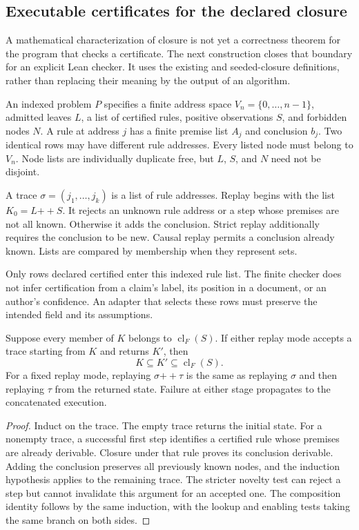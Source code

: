 \subsection{Executable certificates for the declared closure}
\label{sec:trace-checker}

A mathematical characterization of closure is not yet a correctness theorem for the program that checks a certificate. The next construction closes that boundary for an explicit Lean checker. It uses the existing  and seeded-closure definitions, rather than replacing their meaning by the output of an algorithm.

\begin{definition}
\label{res:trace:problem}
An indexed problem $P$ specifies a finite address space $V_n=\{0,\ldots,n-1\}$, admitted leaves $L$, a list of certified rules, positive observations $S$, and forbidden nodes $N$. A rule at address $j$ has a finite premise list $A_j$ and conclusion $b_j$. Two identical rows may have different rule addresses. Every listed node must belong to $V_n$. Node lists are individually duplicate free, but $L$, $S$, and $N$ need not be disjoint.

A trace $\sigma=(j_1,\ldots,j_k)$ is a list of rule addresses. Replay begins with the list $K_0=L\mathbin{+\!+}S$. It rejects an unknown rule address or a step whose premises are not all known. Otherwise it adds the conclusion. Strict replay additionally requires the conclusion to be new. Causal replay permits a conclusion already known. Lists are compared by membership when they represent sets.
\end{definition}

Only rows declared certified enter this indexed rule list. The finite checker does not infer certification from a claim's label, its position in a document, or an author's confidence. An adapter that selects these rows must preserve the intended field and its assumptions.

\begin{theorem}
\label{res:trace:replay}
Suppose every member of $K$ belongs to $\operatorname{cl}_F(S)$. If either replay mode accepts a trace starting from $K$ and returns $K'$, then
\[
 K\subseteq K'\subseteq\operatorname{cl}_F(S).
\]
For a fixed replay mode, replaying $\sigma\mathbin{+\!+}\tau$ is the same as replaying $\sigma$ and then replaying $\tau$ from the returned state. Failure at either stage propagates to the concatenated execution.
\end{theorem}
\begin{proof}
Induct on the trace. The empty trace returns the initial state. For a nonempty trace, a successful first step identifies a certified rule whose premises are already derivable. Closure under that rule proves its conclusion derivable. Adding the conclusion preserves all previously known nodes, and the induction hypothesis applies to the remaining trace. The stricter novelty test can reject a step but cannot invalidate this argument for an accepted one. The composition identity follows by the same induction, with the lookup and enabling tests taking the same branch on both sides.
\end{proof}

